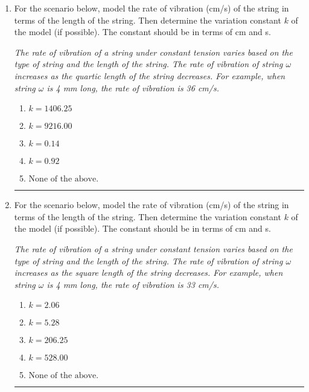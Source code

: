 \documentclass[14pt]{extbook}
\newcommand{\litem}[1]{\item#1\hspace*{-1cm}\rule{\textwidth}{0.4pt}}
\begin{document}
\begin{enumerate}
{\begin{enumerate}[label=\Alph*.]
\end{enumerate} }
\litem{
For the scenario below, model the rate of vibration (cm/s) of the string in terms of the length of the string. Then determine the variation constant $k$ of the model (if possible). The constant should be in terms of cm and s.
\begin{center}
    \textit{ The rate of vibration of a string under constant tension varies based on the type of string and the length of the string. The rate of vibration of string $\omega$ increases as the quartic length of the string decreases. For example, when string $\omega$ is 4 mm long, the rate of vibration is 36 cm/s. }
\end{center}
\begin{enumerate}[label=\Alph*.]
\item \( k = 1406.25 \)
\item \( k = 9216.00 \)
\item \( k = 0.14 \)
\item \( k = 0.92 \)
\item \( \text{None of the above.} \)

\end{enumerate} }
\litem{
For the scenario below, model the rate of vibration (cm/s) of the string in terms of the length of the string. Then determine the variation constant $k$ of the model (if possible). The constant should be in terms of cm and s.
\begin{center}
    \textit{ The rate of vibration of a string under constant tension varies based on the type of string and the length of the string. The rate of vibration of string $\omega$ increases as the square length of the string decreases. For example, when string $\omega$ is 4 mm long, the rate of vibration is 33 cm/s. }
\end{center}
\begin{enumerate}[label=\Alph*.]
\item \( k = 2.06 \)
\item \( k = 5.28 \)
\item \( k = 206.25 \)
\item \( k = 528.00 \)
\item \( \text{None of the above.} \)


\end{enumerate}}
\end{enumerate}
\end{document}
